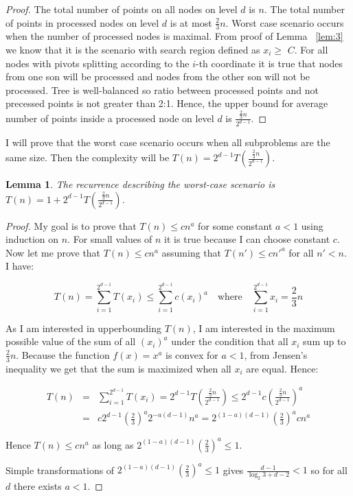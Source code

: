 \documentclass[10pt,a4paper]{article}
\newtheorem{lemma}{Lemma}
\begin{document}
\begin{proof}

The total number of points on all nodes on level $d$ is $n$. The total number of points in processed nodes on level $d$ is at most $\frac{2}{3}n$. Worst case scenario occurs when the number of processed nodes is maximal. From proof of Lemma ~\ref{lem:3} we know that it is the scenario with search region defined as $x_i \geq$ $C$. For all nodes with pivots splitting according to the $i$-th coordinate it is true that nodes from one son will be processed and nodes from the other son will not be processed. Tree is well-balanced so ratio between processed points and not precessed points is not greater than 2:1. Hence, the upper bound for average number of points inside a processed node on level $d$ is $\frac{\frac{2}{3}n}{2^{d-1}}$.
\end{proof}

I will prove that the worst case scenario occurs when all subproblems are the same size. Then the complexity will be $T(n)=2^{d-1}T(\frac{\frac{2}{3}n}{2^{d-1}})$.

\begin{lemma}\label{lem:5}
The recurrence describing the worst-case scenario is $T(n)=1+2^{d-1}T(\frac{\frac{2}{3}n}{2^{d-1}})$.
\end{lemma}

\begin{proof}

My goal is to prove that $T(n) \leq c n^a$ for some constant $a < 1$ using induction on $n$. For small values of $n$ it is true because I can choose constant $c$. Now let me prove that $T(n) \leq c n^a$ assuming that $T(n') \leq c n'^a$ for all $n'<n$. I have:

$$T(n) = \displaystyle\sum\limits_{i=1}^{2^{d-1}} T(x_i)\leq\displaystyle\sum\limits_{i=1}^{2^{d-1}} c(x_i)^{a}  \quad\text{where}\quad  \displaystyle\sum\limits_{i=1}^{2^{d-1}} x_i = \frac{2}{3}n$$ 

As I am interested in upperbounding $T(n)$, I am interested in the maximum possible value of the sum of all $(x_i)^{a}$ under the condition that all $x_{i}$ sum up to $\frac{2}{3}n$. Because the function $f(x)=x^{a}$ is convex for $a<1$, from Jensen's inequality we get that the sum is maximized when all $x_{i}$ are equal. Hence:

\begin{eqnarray*}
T(n) &=& \displaystyle\sum\limits_{i=1}^{2^{d-1}} T(x_i) = 2^{d-1} T\left(\frac{\frac{2}{3}n}{2^{d-1}}\right) \leq 2^{d-1} c \left(\frac{\frac{2}{3}n}{2^{d-1}}\right) ^ a  \\
& = & c 2^{d-1} \left(\frac{2}{3}\right)^a 2^{-a(d-1)} n^a = 2^{(1-a)(d-1)} \left(\frac{2}{3}\right)^a c n^a
\end{eqnarray*}

Hence $T(n)\leq c n^{a}$ as long as $2^{(1-a)(d-1)} (\frac{2}{3})^a \leq 1$.
\bigskip


Simple transformations of $2^{(1-a)(d-1)} (\frac{2}{3})^a \leq 1$ gives $\frac{d-1}{\log_2{3} + d - 2} < 1$ so for all $d$ there exists $a < 1$.

\end{proof}
\end{document}
